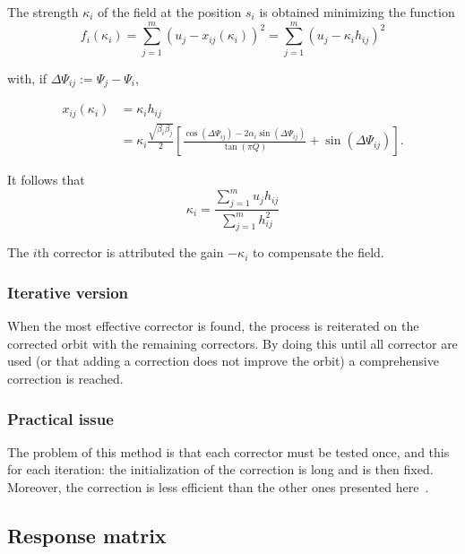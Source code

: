 The strength $\kappa_i$ of the field at the position $s_i$ is obtained minimizing the function
\begin{equation}
    \label{eq:gain_bestcorr}
    f_i(\kappa_i) = \sum\limits_{j=1}^{m} (u_j-x_{ij}(\kappa_i))^2 
                  = \sum\limits_{j=1}^{m} (u_j- \kappa_i h_{ij})^2
\end{equation}

with, if $\Delta \Psi_{ij} := \Psi_j-\Psi_i$,

\begin{align}
    \label{eq:hij}
    x_{ij}(\kappa_i) &= \kappa_i h_{ij} \nonumber\\
                     &= \kappa_i \frac{\sqrt{\beta_i \beta_j}}{2}
                         \left[
                             \frac{\cos(\Delta \Psi_{ij}) - 2\alpha_i \sin(\Delta\Psi_{ij})}
                                  {\tan (\pi Q)} + \sin (\Delta\Psi_{ij})
                         \right].
\end{align}

It follows that 
\begin{equation}
    \kappa_i = \frac{\sum\limits_{j=1}^m u_j h_{ij}}{\sum\limits_{j=1}^m h_{ij}^2}
\end{equation}

The $i$th corrector is attributed the gain $-\kappa_i$ to compensate the field.

\subsubsection{Iterative version}
When the most effective corrector is found, the process is reiterated on the corrected orbit with the remaining correctors. By doing this until all corrector are used (or that adding a correction does not improve the orbit) a comprehensive correction is reached.

\subsubsection{Practical issue}
The problem of this method is that each corrector must be tested once, and this for each iteration: the initialization of the correction is long and is then fixed. Moreover, the correction is less efficient than the other ones presented here~\cite{book:wille}.

\subsection{Response matrix}
\label{sec:response_matrix}

